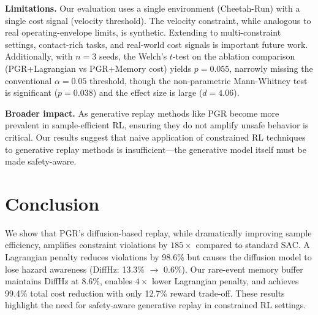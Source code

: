 \documentclass[11pt]{article}
\begin{document}
\textbf{Limitations.}
Our evaluation uses a single environment (Cheetah-Run) with a single cost signal (velocity threshold).
The velocity constraint, while analogous to real operating-envelope limits, is synthetic.
Extending to multi-constraint settings, contact-rich tasks, and real-world cost signals is important future work.
Additionally, with $n{=}3$ seeds, the Welch's $t$-test on the ablation comparison (PGR+Lagrangian vs PGR+Memory cost) yields $p{=}0.055$, narrowly missing the conventional $\alpha{=}0.05$ threshold, though the non-parametric Mann-Whitney test is significant ($p{=}0.038$) and the effect size is large ($d{=}4.06$).

\textbf{Broader impact.}
As generative replay methods like PGR become more prevalent in sample-efficient RL, ensuring they do not amplify unsafe behavior is critical.
Our results suggest that naive application of constrained RL techniques to generative replay methods is insufficient---the generative model itself must be made safety-aware.

\section{Conclusion}

We show that PGR's diffusion-based replay, while dramatically improving sample efficiency, amplifies constraint violations by $185\times$ compared to standard SAC.
A Lagrangian penalty reduces violations by 98.6\% but causes the diffusion model to lose hazard awareness (DiffHz: 13.3\% $\to$ 0.6\%).
Our rare-event memory buffer maintains DiffHz at 8.6\%, enables $4\times$ lower Lagrangian penalty, and achieves 99.4\% total cost reduction with only 12.7\% reward trade-off.
These results highlight the need for safety-aware generative replay in constrained RL settings.
\end{document}

